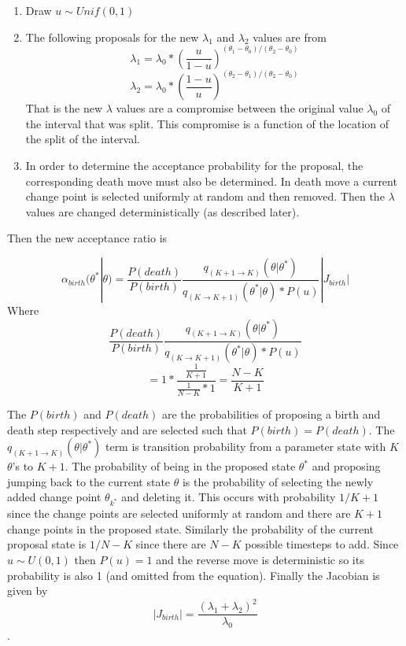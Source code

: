 \documentclass[11pt,a4paper]{article}
\numberwithin{equation}{section}
\begin{document}
\begin{enumerate}
\def\labelenumi{\arabic{enumi}.}
\item
  Draw \(u \sim Unif(0,1)\)
\item
  The following proposals for the new \(\lambda_1\) and \(\lambda_2\)
  values are from
  \[\lambda_1 = \lambda_0*(\frac{u}{1-u})^{(\theta_1-\theta_0)/(\theta_2-\theta_0)}\]
  \[\lambda_2 = \lambda_0*(\frac{1-u}{u})^{(\theta_2-\theta_1)/(\theta_2-\theta_0)}\]
  That is the new \(\lambda\) values are a compromise between the
  original value \(\lambda_0\) of the interval that was split. This
  compromise is a function of the location of the split of the interval.
\item
  In order to determine the acceptance probability for the proposal, the
  corresponding death move must also be determined. In death move a
  current change point is selected uniformly at random and then removed.
  Then the \(\lambda\) values are changed deterministically (as
  described later).
\end{enumerate}

Then the new acceptance ratio is

\[\alpha_{birth}(\theta^*|\theta) = \frac{P(death)}{P(birth)}\frac{q_{(K+1\rightarrow K)}(\theta|\theta^*)}{q_{(K\rightarrow K + 1)}(\theta^*|\theta)*P(u)}|J_{birth}|\]
Where
\[  \frac{P(death)}{P(birth)}\frac{q_{(K+1\rightarrow K)}(\theta|\theta^*)}{q_{(K\rightarrow K + 1)}(\theta^*|\theta)*P(u)} \]
\[= 1*\frac{\frac{1}{K+1}}{\frac{1}{N-K}*1} = \frac{N-K}{K+1} \]

The \(P(birth)\) and \(P(death)\) are the probabilities of proposing a
birth and death step respectively and are selected such that
\(P(birth) = P(death)\). The \(q_{(K+1\rightarrow K)}(\theta|\theta^*)\)
term is transition probability from a parameter state with \(K\)
\(\theta\)'s to \(K+1\). The probability of being in the proposed state
\(\theta^*\) and proposing jumping back to the current state \(\theta\)
is the probability of selecting the newly added change point
\(\theta_{k^*}\) and deleting it. This occurs with probability \(1/K+1\)
since the change points are selected uniformly at random and there are
\(K+1\) change points in the proposed state. Similarly the probability
of the current proposal state is \(1/N-K\) since there are \(N-K\)
possible timesteps to add. Since \(u \sim U(0,1)\) then \(P(u) = 1\) and
the reverse move is deterministic so its probability is also 1 (and
omitted from the equation). Finally the Jacobian is given by
\[ |J_{birth}| = \frac{(\lambda_1 + \lambda_2)^2}{\lambda_0}\] .
\end{document}
